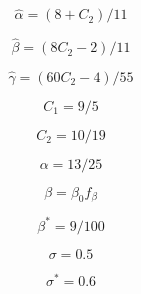 {\newpage\clearpage
{}%
\begin{displaymath}
\hat \alpha = (8+C_2)/11
\end{displaymath}%
\lthtmldisplayZ
\lthtmlcheckvsize\clearpage}

{\newpage\clearpage
{}%
\begin{displaymath}
\hat \beta = (8 C_2-2)/11
\end{displaymath}%
\lthtmldisplayZ
\lthtmlcheckvsize\clearpage}

{\newpage\clearpage
{}%
\begin{displaymath}
\hat \gamma = (60 C_2 - 4)/55
\end{displaymath}%
\lthtmldisplayZ
\lthtmlcheckvsize\clearpage}

{\newpage\clearpage
{}%
\begin{displaymath}
C_1 = 9/5
\end{displaymath}%
\lthtmldisplayZ
\lthtmlcheckvsize\clearpage}

{\newpage\clearpage
{}%
\begin{displaymath}
C_2 = 10/19
\end{displaymath}%
\lthtmldisplayZ
\lthtmlcheckvsize\clearpage}

{\newpage\clearpage
{}%
\begin{displaymath}
\alpha = 13/25
\end{displaymath}%
\lthtmldisplayZ
\lthtmlcheckvsize\clearpage}

{\newpage\clearpage
{}%
\begin{displaymath}
\beta = \beta_0 f_{\beta}
\end{displaymath}%
\lthtmldisplayZ
\lthtmlcheckvsize\clearpage}

{\newpage\clearpage
{}%
\begin{displaymath}
\beta^* = 9/100
\end{displaymath}%
\lthtmldisplayZ
\lthtmlcheckvsize\clearpage}

{\newpage\clearpage
{}%
\begin{displaymath}
\sigma=0.5
\end{displaymath}%
\lthtmldisplayZ
\lthtmlcheckvsize\clearpage}

{\newpage\clearpage
{}%
\begin{displaymath}
\sigma^*=0.6
\end{displaymath}%
\lthtmldisplayZ
\lthtmlcheckvsize\clearpage}

